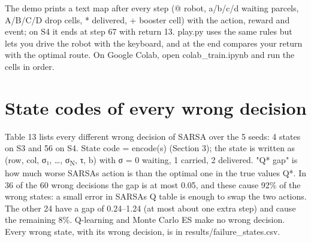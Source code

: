 \documentclass[12pt,a4paper]{article}
\begin{document}
The demo prints a text map after every step (@ robot, a/b/c/d waiting
parcels, A/B/C/D drop cells, * delivered, + booster cell) with the
action, reward and event; on S4 it ends at step 67 with return 13.
play.py uses the same rules but lets you drive the robot with the
keyboard, and at the end compares your return with the optimal route. On
Google Colab, open colab\_train.ipynb and run the cells in order.

\hypertarget{appendix-a.-state-codes-of-every-wrong-decision}{%
\appendix
\section{State codes of every wrong
decision}\label{appendix-a.-state-codes-of-every-wrong-decision}}

Table 13 lists every different wrong decision of SARSA over the 5 seeds:
4 states on S3 and 56 on S4. State code = encode(s) (Section 3); the
state is written as (row, col, σ₁, \ldots, σ\textsubscript{N}, τ, b)
with σ = 0 waiting, 1 carried, 2 delivered. "Q* gap" is how much worse
SARSA\textquotesingle s action is than the optimal one in the true
values Q*. In 36 of the 60 wrong decisions the gap is at most 0.05, and
these cause 92\% of the wrong states: a small error in
SARSA\textquotesingle s Q table is enough to swap the two actions. The
other 24 have a gap of 0.24--1.24 (at most about one extra step) and
cause the remaining 8\%. Q-learning and Monte Carlo ES make no wrong
decision. Every wrong state, with its wrong decision, is in
results/failure\_states.csv.
\end{document}
